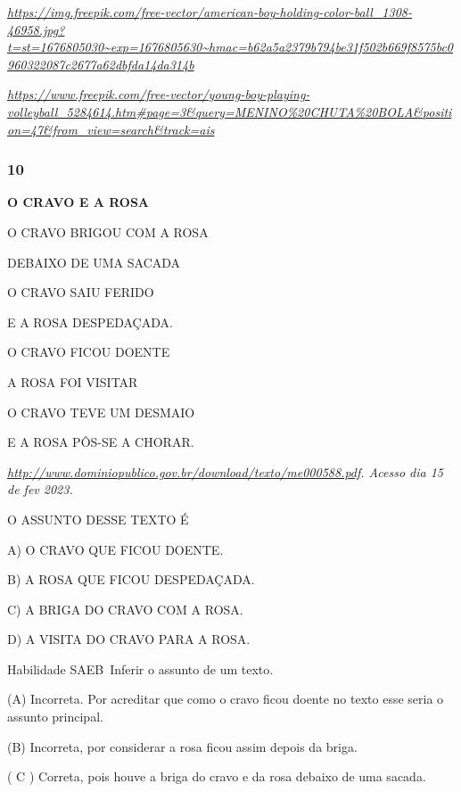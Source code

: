 \begin{escola}
\href{https://img.freepik.com/free-vector/american-boy-holding-color-ball_1308-46958.jpg?t=st=1676805030~exp=1676805630~hmac=b62a5a2379b794be31f502b669f8575bc0960322087c2677a62dbfda14da314b}{\emph{https://img.freepik.com/free-vector/american-boy-holding-color-ball\_1308-46958.jpg?t=st=1676805030\textasciitilde{}exp=1676805630\textasciitilde{}hmac=b62a5a2379b794be31f502b669f8575bc0960322087c2677a62dbfda14da314b}}

\href{https://www.freepik.com/free-vector/young-boy-playing-volleyball_5284614.htm\#page=3\&query=MENINO\%20CHUTA\%20BOLA\&position=47\&from_view=search\&track=ais}{\emph{https://www.freepik.com/free-vector/young-boy-playing-volleyball\_5284614.htm\#page=3\&query=MENINO\%20CHUTA\%20BOLA\&position=47\&from\_view=search\&track=ais}}

\subsubsection{10}\label{section-35}

\textbf{O CRAVO E A ROSA}

O CRAVO BRIGOU COM A ROSA

DEBAIXO DE UMA SACADA

O CRAVO SAIU FERIDO

E A ROSA DESPEDAÇADA.

O CRAVO FICOU DOENTE

A ROSA FOI VISITAR

O CRAVO TEVE UM DESMAIO

E A ROSA PÔS-SE A CHORAR.

\emph{\url{http://www.dominiopublico.gov.br/download/texto/me000588.pdf}.
Acesso dia 15 de fev 2023.}

O ASSUNTO DESSE TEXTO É

A) O CRAVO QUE FICOU DOENTE.

B) A ROSA QUE FICOU DESPEDAÇADA.

C) A BRIGA DO CRAVO COM A ROSA.

D) A VISITA DO CRAVO PARA A ROSA.

Habilidade SAEB~Inferir o assunto de um texto.

\protect\hypertarget{_heading=h.4f1mdlm}{}{}(A) Incorreta. Por acreditar
que como o cravo ficou doente no texto esse seria o assunto principal.

(B) Incorreta, por considerar a rosa ficou assim depois da briga.

( C ) Correta, pois houve a briga do cravo e da rosa debaixo de uma
sacada.


\end{escola}
